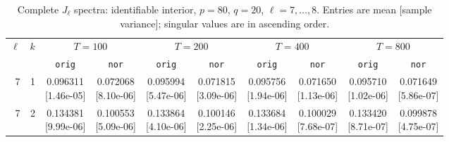 \documentclass[12pt,letterpaper]{article}
\def\spacingset#1{\renewcommand{\baselinestretch}{#1}\small\normalsize}
\theoremstyle{plain}
\theoremstyle{definition}
\begin{document}
\clearpage
\begin{table}[p]
\begingroup
\spacingset{1.0}
\small\centering
\caption{Complete $J_\ell$ spectra: identifiable interior, $p=80$, $q=20$, $\ell=7,\ldots,8$. Entries are mean [sample variance]; singular values are in ascending order.}
\label{s23:lambda:alltab:spectra:p80q20interior:7-8}
\footnotesize
\setlength{\tabcolsep}{2.2pt}
\renewcommand{\arraystretch}{1.03}
\begin{adjustbox}{max width=\linewidth}
\begin{tabular}{@{}rr*{8}{c}@{}}
\toprule
$\ell$ & $k$ & \multicolumn{2}{c}{$T=100$} & \multicolumn{2}{c}{$T=200$} & \multicolumn{2}{c}{$T=400$} & \multicolumn{2}{c}{$T=800$}\\
\cmidrule(lr){3-4}\cmidrule(lr){5-6}\cmidrule(lr){7-8}\cmidrule(lr){9-10}
 &  & \texttt{orig} & \texttt{nor} & \texttt{orig} & \texttt{nor} & \texttt{orig} & \texttt{nor} & \texttt{orig} & \texttt{nor}\\
\midrule
7 & 1 & \shortstack{0.096311\\[-1pt]{\scriptsize[1.46e-05]}} & \shortstack{0.072068\\[-1pt]{\scriptsize[8.10e-06]}} & \shortstack{0.095994\\[-1pt]{\scriptsize[5.47e-06]}} & \shortstack{0.071815\\[-1pt]{\scriptsize[3.09e-06]}} & \shortstack{0.095756\\[-1pt]{\scriptsize[1.94e-06]}} & \shortstack{0.071650\\[-1pt]{\scriptsize[1.13e-06]}} & \shortstack{0.095710\\[-1pt]{\scriptsize[1.02e-06]}} & \shortstack{0.071649\\[-1pt]{\scriptsize[5.86e-07]}}\\
7 & 2 & \shortstack{0.134381\\[-1pt]{\scriptsize[9.99e-06]}} & \shortstack{0.100553\\[-1pt]{\scriptsize[5.09e-06]}} & \shortstack{0.133864\\[-1pt]{\scriptsize[4.10e-06]}} & \shortstack{0.100146\\[-1pt]{\scriptsize[2.25e-06]}} & \shortstack{0.133684\\[-1pt]{\scriptsize[1.34e-06]}} & \shortstack{0.100029\\[-1pt]{\scriptsize[7.68e-07]}} & \shortstack{0.133420\\[-1pt]{\scriptsize[8.71e-07]}} & \shortstack{0.099878\\[-1pt]{\scriptsize[4.75e-07]}}\\

\end{tabular}
\end{adjustbox}
\end{table}
\end{document}
